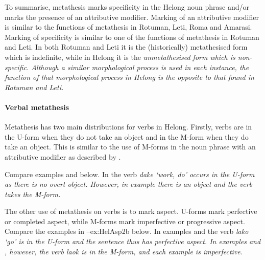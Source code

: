 To summarise, metathesis marks specificity in the Helong noun phrase
and/or marks the presence of an attributive modifier.
Marking of an attributive modifier is similar to the functions
of metathesis in Rotuman, Leti, Roma and Amarasi.
Marking of specificity is similar to one of the functions of metathesis in Rotuman and Leti.
In both Rotuman and Leti it is the (historically) metathesised form which is indefinite,
while in Helong it is the \it{un}metathesised form which is non-specific.
Although a similar morphological process is used in each instance,
the function of that morphological process in Helong is the opposite
to that found in Rotuman and Leti.

\paragraph{Verbal metathesis}\label{sec:VerMet}
Metathesis has two main distributions for verbs in Helong.
Firstly, verbs are in the U-form when they do not take an object
and in the M-form when they do take an object.
This is similar to the use of M-forms in the noun
phrase with an attributive modifier as described by \cite{st96b}.

Compare examples  and  below.
In  the verb \it{dake} `work, do' occurs in the U-form
as there is no overt object.
However, in example  there is an object
and the verb takes the M-form.

\begin{exe}\let\eachwordone=\it
	\label{ex:HelObj1}
	\label{ex:HelObj2}
\end{exe}

The other use of metathesis on verbs is to mark aspect.
U-forms mark perfective or completed aspect,
while M-forms mark imperfective or progressive aspect.
Compare the examples in --{ex:HelAsp2b} below.
In examples  and  the verb \it{lako} `go'
is in the U-form and the sentence thus has perfective aspect.
In examples  and , however,
the verb \it{laok} is in the M-form,
and each example is imperfective.

